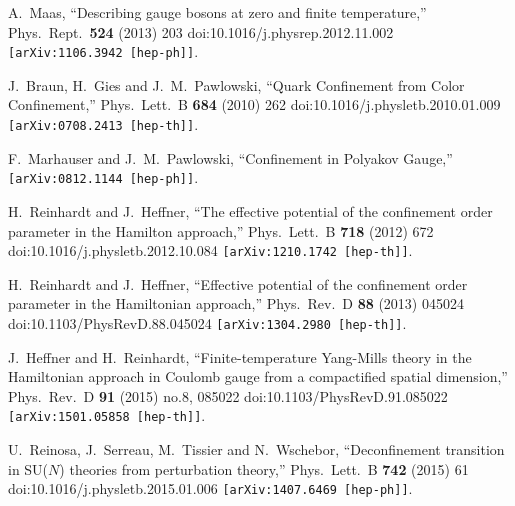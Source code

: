\documentclass[a4paper,11pt,british,twosides]{book}%
\numberwithin{equation}{section}
\begin{document}
\begin{thebibliography}{9}
  A.~Maas,
  ``Describing gauge bosons at zero and finite temperature,''
  Phys.\ Rept.\  {\bf 524} (2013) 203
  doi:10.1016/j.physrep.2012.11.002
  {\tt [arXiv:1106.3942 [hep-ph]]}.

  J.~Braun, H.~Gies and J.~M.~Pawlowski,
  ``Quark Confinement from Color Confinement,''
  Phys.\ Lett.\ B {\bf 684} (2010) 262
  doi:10.1016/j.physletb.2010.01.009
  {\tt [arXiv:0708.2413 [hep-th]]}.

  F.~Marhauser and J.~M.~Pawlowski,
  ``Confinement in Polyakov Gauge,''
  {\tt [arXiv:0812.1144 [hep-ph]]}.

  H.~Reinhardt and J.~Heffner,
  ``The effective potential of the confinement order parameter in the Hamilton approach,''
  Phys.\ Lett.\ B {\bf 718} (2012) 672
  doi:10.1016/j.physletb.2012.10.084
  {\tt [arXiv:1210.1742 [hep-th]]}.

  H.~Reinhardt and J.~Heffner,
  ``Effective potential of the confinement order parameter in the Hamiltonian approach,''
  Phys.\ Rev.\ D {\bf 88} (2013) 045024
  doi:10.1103/PhysRevD.88.045024
  {\tt [arXiv:1304.2980 [hep-th]]}.

  J.~Heffner and H.~Reinhardt,
  ``Finite-temperature Yang-Mills theory in the Hamiltonian approach in Coulomb gauge from a
  compactified spatial dimension,''
  Phys.\ Rev.\ D {\bf 91} (2015) no.8,  085022
  doi:10.1103/PhysRevD.91.085022
  {\tt [arXiv:1501.05858 [hep-th]]}.

  U.~Reinosa, J.~Serreau, M.~Tissier and N.~Wschebor,
  ``Deconfinement transition in SU($N$) theories from perturbation theory,''
  Phys.\ Lett.\ B {\bf 742} (2015) 61
  doi:10.1016/j.physletb.2015.01.006
  {\tt [arXiv:1407.6469 [hep-ph]]}.


\end{thebibliography}
\end{document}
